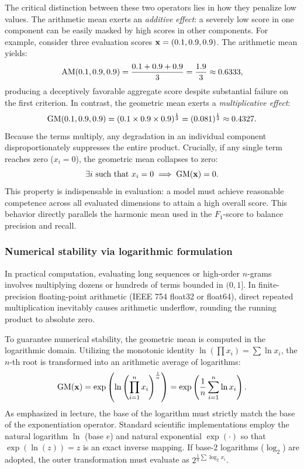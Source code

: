 \documentclass[../../../main.tex]{subfiles}
\begin{document}
The critical distinction between these two operators lies in how they penalize low values. The arithmetic mean exerts an \textit{additive effect}: a severely low score in one component can be easily masked by high scores in other components. For example, consider three evaluation scores $\mathbf{x} = (0.1, 0.9, 0.9)$. The arithmetic mean yields:
\begin{equation}
\mathrm{AM}(0.1, 0.9, 0.9) = \frac{0.1 + 0.9 + 0.9}{3} = \frac{1.9}{3} \approx 0.6333,
\end{equation}
producing a deceptively favorable aggregate score despite substantial failure on the first criterion. In contrast, the geometric mean exerts a \textit{multiplicative effect}:
\begin{equation}
\mathrm{GM}(0.1, 0.9, 0.9) = (0.1 \times 0.9 \times 0.9)^{\frac{1}{3}} = (0.081)^{\frac{1}{3}} \approx 0.4327.
\end{equation}
Because the terms multiply, any degradation in an individual component disproportionately suppresses the entire product. Crucially, if any single term reaches zero ($x_i = 0$), the geometric mean collapses to zero:
\begin{equation}
\label{eq:geometric_mean_zero_collapse}
\exists i \text{ such that } x_i = 0 \implies \mathrm{GM}(\mathbf{x}) = 0.
\end{equation}
This property is indispensable in evaluation: a model must achieve reasonable competence across all evaluated dimensions to attain a high overall score. This behavior directly parallels the harmonic mean used in the $F_1$-score to balance precision and recall.

\subsubsection{Numerical stability via logarithmic formulation}
In practical computation, evaluating long sequences or high-order $n$-grams involves multiplying dozens or hundreds of terms bounded in $(0, 1]$. In finite-precision floating-point arithmetic (IEEE 754 float32 or float64), direct repeated multiplication inevitably causes arithmetic underflow, rounding the running product to absolute zero.

To guarantee numerical stability, the geometric mean is computed in the logarithmic domain. Utilizing the monotonic identity $\ln\left(\prod x_i\right) = \sum \ln x_i$, the $n$-th root is transformed into an arithmetic average of logarithms:
\begin{equation}
\label{eq:geometric_mean_log_trick}
\mathrm{GM}(\mathbf{x}) = \exp\left( \ln\left( \prod_{i=1}^n x_i \right)^{\frac{1}{n}} \right) = \exp\left( \frac{1}{n} \sum_{i=1}^n \ln x_i \right).
\end{equation}
As emphasized in lecture, the base of the logarithm must strictly match the base of the exponentiation operator. Standard scientific implementations employ the natural logarithm $\ln$ (base $e$) and natural exponential $\exp(\cdot)$ so that $\exp(\ln(z)) = z$ is an exact inverse mapping. If base-2 logarithms ($\log_2$) are adopted, the outer transformation must evaluate as $2^{\frac{1}{n} \sum \log_2 x_i}$.
\end{document}
